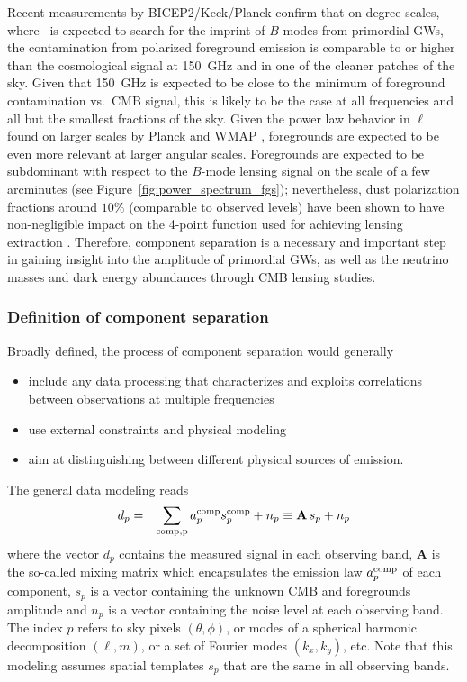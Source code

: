 Recent measurements by BICEP2/Keck/Planck \cite{bicepkeckplanck15} confirm that on degree scales, where 
\cmbexp\ is expected to search for 
the imprint of $B$ modes from primordial GWs, the contamination from polarized foreground emission is  comparable to or higher than the cosmological signal at 150~GHz and in one of the cleaner patches of the sky.
Given that 150~GHz is expected to be close to the minimum of foreground contamination vs.~CMB signal, this 
is likely to be the case at all frequencies and all but the smallest fractions of the sky.
Given the power law behavior in $\ell$ found on larger scales by Planck and WMAP \cite{planck15-9,page07}, foregrounds are expected to be even more relevant at larger angular scales. Foregrounds are expected to be subdominant  with respect to the $B$-mode lensing signal on the scale of a few arcminutes (see Figure~\ref{fig:power_spectrum_fgs}); nevertheless, dust polarization fractions around $10\%$ (comparable to observed levels) have been shown to have non-negligible impact on the 4-point function used for achieving lensing extraction \cite{fantaye12}. Therefore, component separation is a necessary and important step in gaining insight into the amplitude of primordial GWs, as well as the neutrino masses and dark energy abundances through CMB lensing studies.%

\subsubsection{Definition of component separation}

Broadly defined, the process of component separation would generally
\begin{itemize}
	\item include any data processing that characterizes and exploits correlations between observations at multiple frequencies
	\item use external constraints and physical modeling
	\item aim at distinguishing between different physical sources of emission.
\end{itemize}

The general data modeling reads
\begin{eqnarray}
	\centering	
		d_p &=& \sum_{\rm comp, p} a_p^{\rm comp} s^{\rm comp}_p + n_p \equiv \mathbf{A}\,s_p + n_p
	\label{eq:comp_sep_data_modeling}
\end{eqnarray}
where the vector $d_p$ contains the measured signal in each observing band, $\mathbf{A}$ is the so-called mixing matrix which encapsulates the emission law $a_p^{\rm comp}$ of each component, $s_p$ is a vector containing the unknown CMB and foregrounds amplitude and $n_p$ is a vector containing the noise level at each observing band. The index $p$ refers to sky pixels $\left( \theta, \phi \right)$, or modes of a spherical harmonic decomposition $\left( \ell, m\right)$, or a set of Fourier modes $\left(k_x,k_y\right)$, etc. Note that this modeling assumes spatial templates $s_p$ that are the same in all observing bands.


